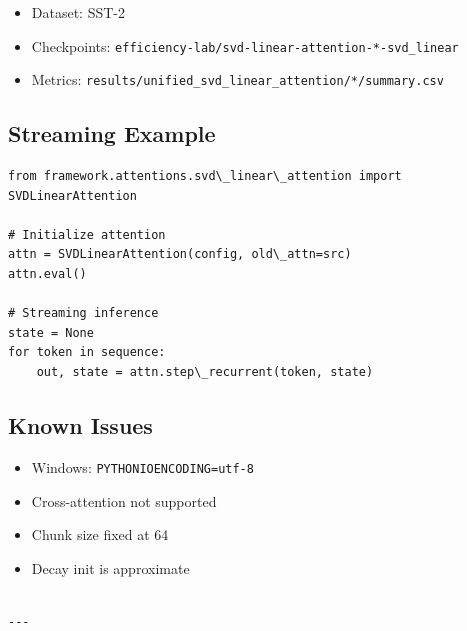 \begin{itemize}
\item Dataset: SST-2
\item Checkpoints: \texttt{efficiency-lab/svd-linear-attention-*-svd\_linear}
\item Metrics: \texttt{results/unified\_svd\_linear\_attention/*/summary.csv}

\end{itemize}
\subsection{Streaming Example}

\begin{lstlisting}
from framework.attentions.svd\_linear\_attention import SVDLinearAttention

# Initialize attention
attn = SVDLinearAttention(config, old\_attn=src)
attn.eval()

# Streaming inference
state = None
for token in sequence:
    out, state = attn.step\_recurrent(token, state)
\end{lstlisting}

\subsection{Known Issues}

\begin{itemize}
\item Windows: \texttt{PYTHONIOENCODING=utf-8}
\item Cross-attention not supported
\item Chunk size fixed at 64
\item Decay init is approximate
\end{itemize}
\begin{lstlisting}

---
\end{lstlisting}